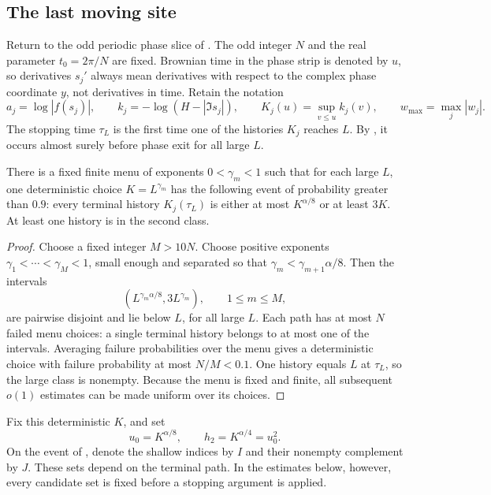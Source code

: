 \subsection{The last moving site}

Return to the odd periodic phase slice of
.  The odd integer \(N\)
and the real parameter \(t_0=2\pi/N\) are fixed.  Brownian time in
the phase strip is denoted by \(u\), so derivatives \(s_j'\) always
mean derivatives with respect to the complex phase coordinate \(y\),
not derivatives in time.  Retain the notation
\[
 a_j=\log|f(s_j)|,\qquad
 k_j=-\log(H-|\Im s_j|),\qquad
 K_j(u)=\sup_{v\le u}k_j(v),\qquad
 w_{\max}=\max_j|w_j|.
\]
The stopping time \(\tau_L\) is the first time one of the histories
\(K_j\) reaches \(L\).  By , it occurs
almost surely before phase exit for all large \(L\).

\begin{lemma}\label{sign:history-gap}
There is a fixed finite menu of exponents \(0<\gamma_m<1\) such
that for each large \(L\), one deterministic choice
\(K=L^{\gamma_m}\) has the following event of probability greater
than \(0.9\): every terminal history \(K_j(\tau_L)\) is either
at most \(K^{\alpha/8}\) or at least \(3K\).  At least one history
is in the second class.
\end{lemma}

\begin{proof}
Choose a fixed integer \(M>10N\).  Choose positive exponents
\(\gamma_1<\cdots<\gamma_M<1\), small enough and separated so that
\(\gamma_m<\gamma_{m+1}\alpha/8\).  Then the intervals
\[
 (L^{\gamma_m\alpha/8},3L^{\gamma_m}),\qquad 1\le m\le M,
\]
are pairwise disjoint and lie below \(L\), for all large \(L\).
Each path has at most \(N\) failed menu choices: a single terminal
history belongs to at most one of the intervals.  Averaging failure
probabilities over the menu gives a deterministic choice with
failure probability at most \(N/M<0.1\).  One history equals \(L\)
at \(\tau_L\), so the large class is nonempty.  Because the menu
is fixed and finite, all subsequent \(o(1)\) estimates can be made
uniform over its choices.
\end{proof}

Fix this deterministic \(K\), and set
\begin{equation}\label{sign:h2}
 u_0=K^{\alpha/8},\qquad h_2=K^{\alpha/4}=u_0^2.
\end{equation}
On the event of , denote the shallow indices
by \(I\) and their nonempty complement by \(J\).  These sets depend
on the terminal path.  In the estimates below, however, every
candidate set is fixed before a stopping argument is applied.

